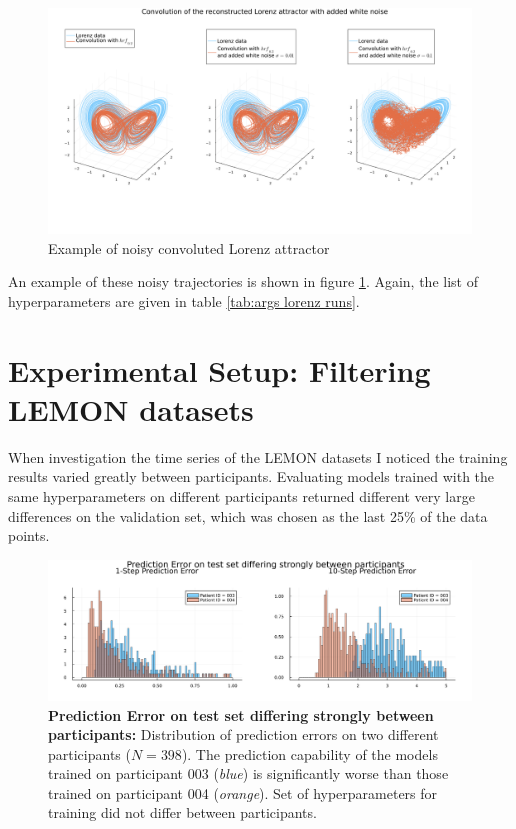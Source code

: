 \begin{figure}
    \includegraphics[width=\textwidth]{Images/lorenz_conv_noise.png}
    \caption[Example of noisy convoluted Lorenz attractor]{Example of noisy convoluted Lorenz attractor}
    \label{fig:lorenz_conv_noise}
\end{figure}

An example of these noisy trajectories is shown in figure \ref{fig:lorenz_conv_noise}. Again, the list of hyperparameters are given in table \ref{tab:args lorenz runs}.

\section{Experimental Setup: Filtering LEMON datasets} \label{sec:filter_lemon}

When investigation the time series of the LEMON datasets I noticed the training results varied greatly between participants. Evaluating models trained with the same hyperparameters
on different participants returned different very large differences on the validation set, which was chosen as the last 25\% of the data points.

\begin{figure}
    \includegraphics[width=\textwidth]{Images/high_var_patient_pe_comparison.png}
    \caption[Prediction Error on test set differing strongly between participants]
    {\textbf{Prediction Error on test set differing strongly between participants: } Distribution of prediction errors on two different participants ($N=398$). The prediction capability of
    the models trained on participant 003 (\textit{blue}) is significantly worse than those trained on participant 004 (\textit{orange}). Set of hyperparameters for training did not 
    differ between participants.}
    \label{fig:high_var_patient_pe_comparison}
\end{figure}

